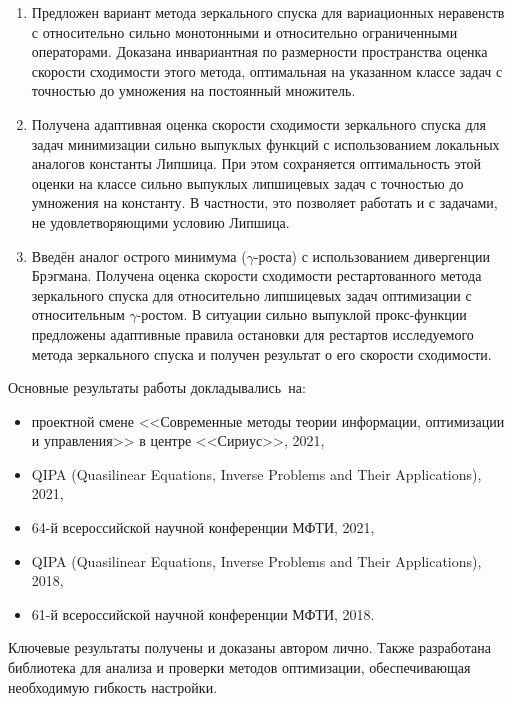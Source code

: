 {}
\begin{enumerate}[beginpenalty=10000] %
  \item Предложен вариант метода зеркального спуска для вариационных неравенств с относительно сильно монотонными и относительно ограниченными операторами. Доказана инвариантная по размерности пространства оценка скорости сходимости этого метода, оптимальная на указанном классе задач с точностью до умножения на постоянный множитель.
  \item Получена адаптивная оценка скорости сходимости зеркального спуска для задач минимизации сильно выпуклых функций с использованием локальных аналогов константы Липшица. При этом сохраняется оптимальность этой оценки на классе сильно выпуклых липшицевых задач с точностью до умножения на константу. В частности, это позволяет работать и с задачами, не удовлетворяющими условию Липшица.
  \item Введён аналог острого минимума ($\gamma$-роста) с использованием дивергенции Брэгмана. Получена оценка скорости сходимости рестартованного метода зеркального спуска для относительно липшицевых задач оптимизации с относительным $\gamma$-ростом. В ситуации сильно выпуклой прокс-функции предложены адаптивные правила остановки для рестартов исследуемого метода зеркального спуска и получен результат о его скорости сходимости.
\end{enumerate}

{\probation}
Основные результаты работы докладывались~на:
\begin{itemize}
    \item проектной смене <<Современные методы теории информации, оптимизации и управления>> в центре <<Сириус>>, 2021,
    \item QIPA (Quasilinear Equations, Inverse Problems and Their Applications), 2021,
    \item 64-й всероссийской научной конференции МФТИ, 2021,
    \item QIPA (Quasilinear Equations, Inverse Problems and Their Applications), 2018,
    \item 61-й всероссийской научной конференции МФТИ, 2018.
\end{itemize}

{\contribution} Ключевые результаты получены и доказаны автором лично. Также разработана библиотека для анализа и проверки методов оптимизации, обеспечивающая необходимую гибкость настройки. 

